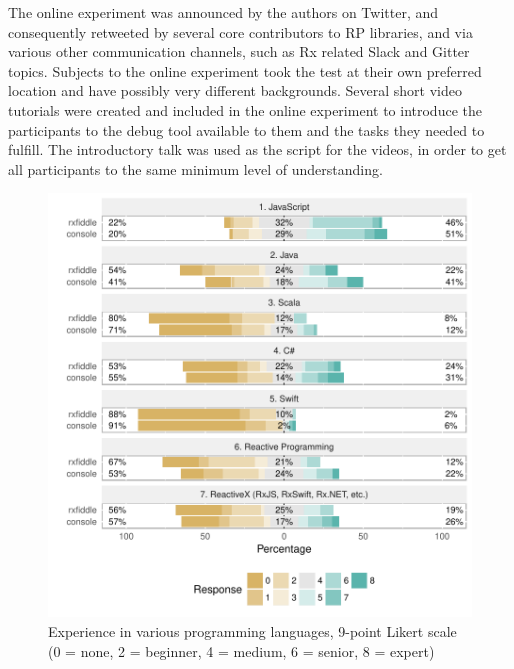 The online experiment was announced by the authors on Twitter, and
consequently retweeted by several core contributors to RP libraries, and
via various other communication channels, such as Rx related Slack and
Gitter topics.  Subjects to the online experiment took the test at their
own preferred location and have possibly very different backgrounds.
Several short video tutorials were created and included in the online
experiment to introduce the participants to the debug tool available to
them and the tasks they needed to fulfill.  The introductory talk was
used as the script for the videos, in order to get all participants to
the same minimum level of understanding.

\begin{figure}[t]
    \includegraphics[width=\columnwidth]{images/experience.pdf}
    \caption{Experience in various programming languages, 9-point Likert
    scale (0 = none, 2 = beginner, 4 = medium, 6 = senior, 8 = expert)}%
    \label{fig-experience}
\end{figure}
